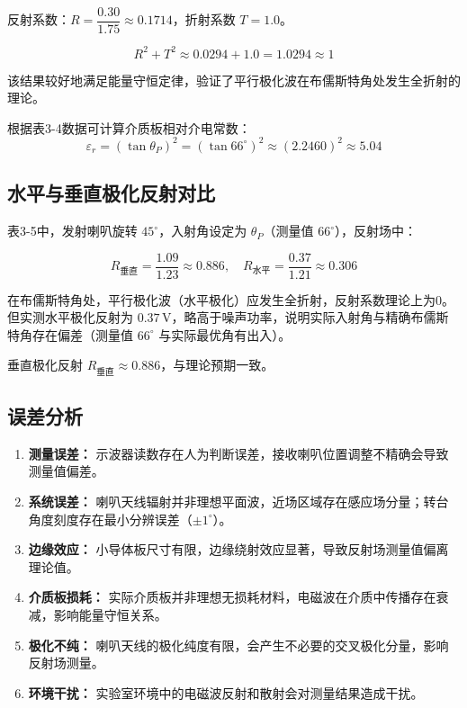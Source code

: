 \documentclass{../ElectromagneticFieldTemplate}
\begin{document}
反射系数：\(R = \dfrac{0.30}{1.75} \approx 0.1714\)，折射系数 \(T = 1.0\)。

\[
R^2 + T^2 \approx 0.0294 + 1.0 = 1.0294 \approx 1
\]

该结果较好地满足能量守恒定律，验证了平行极化波在布儒斯特角处发生全折射的理论。

根据表3-4数据可计算介质板相对介电常数：
\[
\varepsilon_r = \left(\tan\theta_P\right)^2 = \left(\tan 66^\circ\right)^2 \approx (2.2460)^2 \approx 5.04
\]

\subsection{水平与垂直极化反射对比}

表3-5中，发射喇叭旋转 \(45^\circ\)，入射角设定为 \(\theta_P\)（测量值 \(66^\circ\)），反射场中：

\[
R_{\text{垂直}} = \frac{1.09}{1.23} \approx 0.886, \quad R_{\text{水平}} = \frac{0.37}{1.21} \approx 0.306
\]

在布儒斯特角处，平行极化波（水平极化）应发生全折射，反射系数理论上为0。但实测水平极化反射为 \(0.37\,\text{V}\)，略高于噪声功率，说明实际入射角与精确布儒斯特角存在偏差（测量值 \(66^\circ\) 与实际最优角有出入）。

垂直极化反射 \(R_{\text{垂直}} \approx 0.886\)，与理论预期一致。

\subsection{误差分析}

\begin{enumerate}
    \item \textbf{测量误差：} 示波器读数存在人为判断误差，接收喇叭位置调整不精确会导致测量值偏差。
    \item \textbf{系统误差：} 喇叭天线辐射并非理想平面波，近场区域存在感应场分量；转台角度刻度存在最小分辨误差（\(\pm 1^\circ\)）。
    \item \textbf{边缘效应：} 小导体板尺寸有限，边缘绕射效应显著，导致反射场测量值偏离理论值。
    \item \textbf{介质板损耗：} 实际介质板并非理想无损耗材料，电磁波在介质中传播存在衰减，影响能量守恒关系。
    \item \textbf{极化不纯：} 喇叭天线的极化纯度有限，会产生不必要的交叉极化分量，影响反射场测量。
    \item \textbf{环境干扰：} 实验室环境中的电磁波反射和散射会对测量结果造成干扰。
\end{enumerate}
\end{document}
